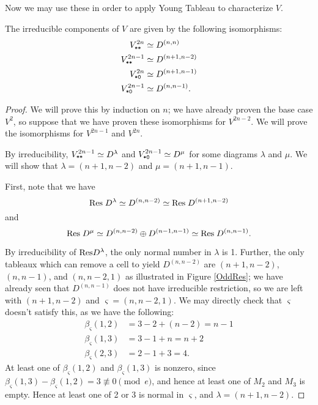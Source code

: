 \documentclass{amsart}
\begin{document}
Now we may use these in order to apply Young Tableau to characterize $V$.
\begin{theorem}
  The irreducible components of $V$ are given by the following isomorphisms:
     \begin{align*}  
      V^{2n}_{\texttt{*}\texttt{*}} &\simeq D^{(n,n)}\\ 
      V^{2n-1}_{\texttt{*}\texttt{*}} &\simeq D^{(n+1,n-2)}\\
      V^{2n}_{\texttt{*}\texttt{0}} &\simeq D^{(n+1,n-1)}\\
      V^{2n-1}_{\texttt{*}\texttt{0}} &\simeq D^{(n,n-1)}.
     \end{align*}
\end{theorem}
\begin{proof}
  We will prove this by induction on $n$;
  we have already proven the base case $V^{2}$, so suppose that we have proven these isomorphisms for $V^{2n-2}$.
  We will prove the isomorphisms for $V^{2n-1}$ and $V^{2n}$.

  By irreducibility, $V^{2n-1}_{\texttt{*}\texttt{*}} \simeq D^{\lambda}$ and $V^{2n-1}_{\texttt{*}\texttt{0}} \simeq D^{\mu}$ for some diagrams $\lambda$ and $\mu$.
  We will show that $\lambda = (n+1,n-2)$ and $\mu = (n+1,n-1)$.
  
  First, note that we have \[\text{Res} \; D^{\lambda} \simeq D^{(n,n-2)} \simeq \text{Res} \; D^{(n+1,n-2)}\] and \[\text{Res} \; D^{\mu} \simeq D^{(n,n-2)} \oplus D^{(n-1,n-1)} \simeq \text{Res} \; D^{(n,n-1)}.\]
  
  By irreducibility of $\text{Res} D^{\lambda}$, the only normal number in $\lambda$ is 1.
  Further, the only tableaux which can remove a cell to yield $D^{(n,n-2)}$ are $(n+1,n-2)$, $(n,n-1)$, and $(n,n-2,1)$ as illustrated in Figure \ref{OddRes};
  we have already seen that $D^{(n,n-1)}$ does not have irreducible restriction, so we are left with $(n+1,n-2)$ and $\varsigma = (n,n-2,1)$.
  We may directly check that $\varsigma$ doesn't satisfy this, as we have the following:
  \begin{align*} 
    \beta_\varsigma(1,2) &= 3 - 2 + (n-2) = n-1\\
    \beta_\varsigma(1,3) &= 3 - 1 + n = n+2\\
    \beta_\varsigma(2,3) &= 2 - 1 + 3 = 4.
   \end{align*} 
  At least one of $\beta_\varsigma(1,2)$ and $\beta_\varsigma(1,3)$ is nonzero, since $\beta_\varsigma(1,3) - \beta_\varsigma(1,2) = 3 \not\equiv 0 \pmod e$, and hence at least one of $M_2$ and $M_3$ is empty.
  Hence at least one of 2 or 3 is normal in $\varsigma$, and $\lambda = (n+1,n-2)$.


\end{proof}
\end{document}
